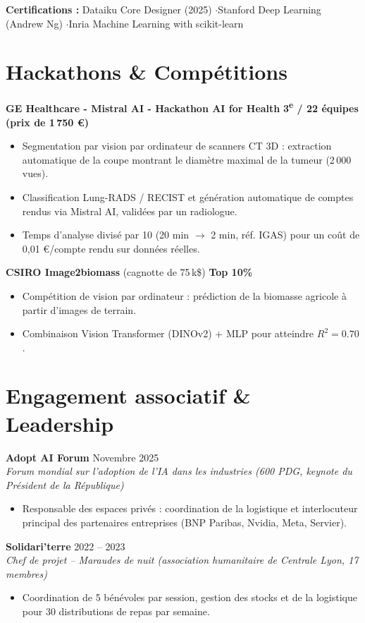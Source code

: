\documentclass[10pt, a4paper]{article}
\begin{document}
\vspace{2pt}
\noindent\textbf{Certifications :} Dataiku Core Designer (2025) \quad$\cdot$\quad Stanford Deep Learning (Andrew Ng) \quad$\cdot$\quad Inria Machine Learning with scikit-learn

\section{Hackathons \& Compétitions}

\textbf{GE Healthcare - Mistral AI - Hackathon AI for Health} \hfill \textbf{3\textsuperscript{e} / 22 équipes (prix de 1\,750 €)}
\begin{itemize}
    \item Segmentation par vision par ordinateur de scanners CT 3D : extraction automatique de la coupe montrant le diamètre maximal de la tumeur (2\,000 vues).
    \item Classification Lung-RADS / RECIST et génération automatique de comptes rendus via Mistral AI, validées par un radiologue.
    \item Temps d'analyse divisé par 10 (20 min $\rightarrow$ 2 min, réf. IGAS) pour un coût de 0,01 €/compte rendu sur données réelles.
\end{itemize}

\textbf{CSIRO Image2biomass} (cagnotte de 75\,k\$) \hfill \textbf{Top 10\%}
\begin{itemize}
    \item Compétition de vision par ordinateur : prédiction de la biomasse agricole à partir d'images de terrain.
    \item Combinaison Vision Transformer (DINOv2) + MLP pour atteindre $R^2 = 0.70$.
\end{itemize}

\section{Engagement associatif \& Leadership}

\textbf{Adopt AI Forum} \hfill Novembre 2025\\
\textit{Forum mondial sur l'adoption de l'IA dans les industries (600 PDG, keynote du Président de la République)}
\begin{itemize}
    \item Responsable des espaces privés : coordination de la logistique et interlocuteur principal des partenaires entreprises (BNP Paribas, Nvidia, Meta, Servier).
\end{itemize}

\textbf{Solidari'terre} \hfill 2022 -- 2023\\
\textit{Chef de projet -- Maraudes de nuit (association humanitaire de Centrale Lyon, 17 membres)}
\begin{itemize}
    \item Coordination de 5 bénévoles par session, gestion des stocks et de la logistique pour 30 distributions de repas par semaine.
\end{itemize}
\end{document}
